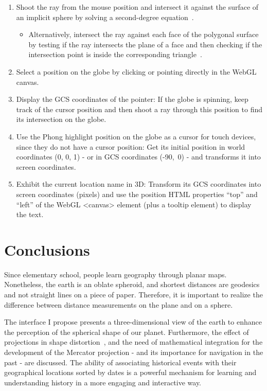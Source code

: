 \documentclass[onecolumn,3p]{elsarticle}
\begin{document}
\begin{enumerate}
    \item Shoot the ray from the mouse position and intersect it against the surface of an
          implicit sphere by solving a second-degree equation~\cite{IllusionCatalyst}.
    \begin{itemize}
        \item Alternatively, intersect the ray against each face of the polygonal surface by
              testing if the ray intersects the plane of a face and then checking if the intersection point is inside the corresponding
              triangle~\cite{Carvalho1995Point}.
    \end{itemize}
    \item Select a position on the globe by clicking or pointing directly in the WebGL canvas.
    \item Display the GCS coordinates of the pointer: If the globe is spinning, keep track of the cursor position and
    then shoot a ray through this position to find its intersection on the globe.
    \item Use the Phong highlight position on the globe as a cursor for touch devices,
          since they do not have a cursor position: Get its initial position in world coordinates
          (0, 0, 1) - or in GCS coordinates \mbox{(-90\textdegree, 0\textdegree)} - and transforms it into screen coordinates.
    \item Exhibit the current location name in 3D: Transform its GCS coordinates into screen coordinates
    (pixels) and use the position HTML properties ``top'' and ``left'' of the WebGL <canvas> element (plus a tooltip element) to display the text.
\end{enumerate}

\section{Conclusions}
Since elementary school, people learn geography through planar maps.
Nonetheless, the earth is an oblate spheroid, and shortest distances are geodesics~\cite{Busemann1955}
and not straight lines on a piece of paper.
Therefore, it is important to realize the difference between distance measurements on the plane and on a sphere.

The interface I propose presents a three-dimensional view of the earth to enhance the perception of the spherical shape of our planet.
Furthermore, the effect of projections in shape distortion~\cite{TrueSize}, and the need of mathematical integration
for the development of the Mercator projection - and its importance for navigation in the past - are discussed.
The ability of associating historical events with their geographical locations sorted by dates is a
powerful mechanism for learning and understanding history in a more engaging and interactive way.
\end{document}
